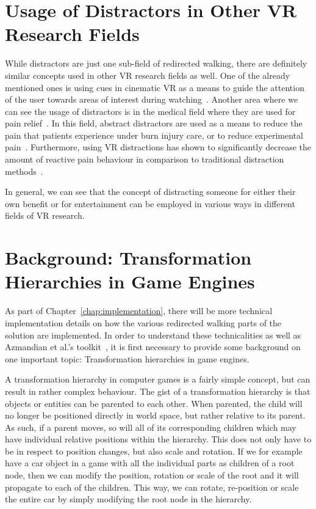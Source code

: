 \section{Usage of Distractors in Other VR Research Fields}
While distractors are just one sub-field of redirected walking, there are definitely similar concepts used in other VR research fields as well. One of the already mentioned ones is using cues in cinematic VR as a means to guide the attention of the user towards areas of interest during watching~\cite{nielsen2016missing}. Another area where we can see the usage of distractors is in the medical field where they are used for pain relief~\cite{malloy2010effectiveness, knight2018virtual}. In this field, abstract distractors are used as a means to reduce the pain that patients experience under burn injury care, or to reduce experimental pain~\cite{malloy2010effectiveness}. Furthermore, using VR distractions has shown to significantly decrease the amount of reactive pain behaviour in comparison to traditional distraction methods~\cite{knight2018virtual}. 

In general, we can see that the concept of distracting someone for either their own benefit or for entertainment can be employed in various ways in different fields of VR research.

\section{Background: Transformation Hierarchies in Game Engines}
As part of Chapter~\ref{chap:implementation}, there will be more technical implementation details on how the various redirected walking parts of the solution are implemented. In order to understand these technicalities as well as Azmandian et al.'s toolkit~\cite{azmandian2016redirected}, it is first necessary to provide some background on one important topic: Transformation hierarchies in game engines.

A transformation hierarchy in computer games is a fairly simple concept, but can result in rather complex behaviour. The gist of a transformation hierarchy is that objects or entities can be parented to each other. When parented, the child will no longer be positioned directly in world space, but rather relative to its parent. As such, if a parent moves, so will all of its corresponding children which may have individual relative positions within the hierarchy. This does not only have to be in respect to position changes, but also scale and rotation. If we for example have a car object in a game with all the individual parts as children of a root node, then we can modify the position, rotation or scale of the root and it will propagate to each of the children. This way, we can rotate, re-position or scale the entire car by simply modifying the root node in the hierarchy.

